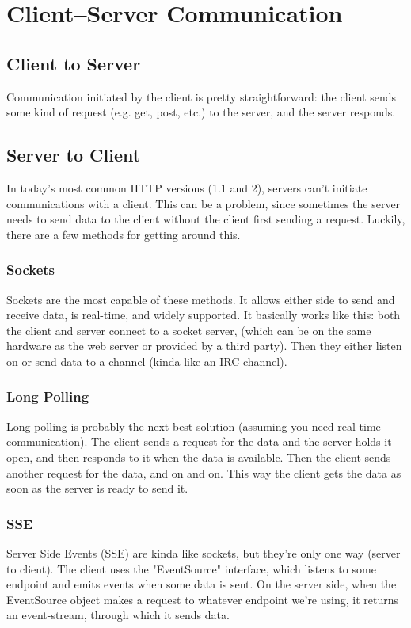 \documentclass[a4paper,12pt,titlepage,oneside,final]{book}
\begin{document}
\chapter{Client--Server Communication}

\section{Client to Server}
Communication initiated by the client is pretty straightforward: the client sends some kind of request (e.g. get, post, etc.) to the server, and the server responds. 

\section{Server to Client}
In today's most common HTTP versions (1.1 and 2), servers can't initiate communications with a client. This can be a problem, since sometimes the server needs to send data to the client without the client first sending a request. Luckily, there are a few methods for getting around this.

\subsection{Sockets}
Sockets are the most capable of these methods. It allows either side to send and receive data, is real-time, and widely supported. It basically works like this: both the client and server connect to a socket server, (which can be on the same hardware as the web server or provided by a third party). Then they either listen on or send data to a channel (kinda like an IRC channel).

\subsection{Long Polling}
Long polling is probably the next best solution (assuming you need real-time communication). The client sends a request for the data and the server holds it open, and then responds to it when the data is available. Then the client sends another request for the data, and on and on. This way the client gets the data as soon as the server is ready to send it.

\subsection{SSE}

Server Side Events (SSE) are kinda like sockets, but they're only one way (server to client). The client uses the "EventSource" interface, which listens to some endpoint and emits events when some data is sent. On the server side, when the EventSource object makes a request to whatever endpoint we're using, it returns an event-stream, through which it sends data.
\end{document}
